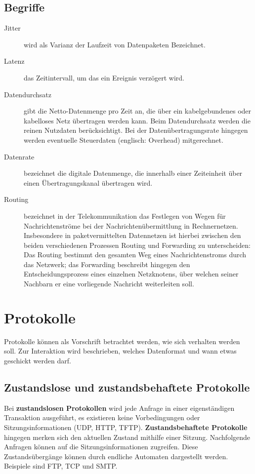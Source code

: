 \documentclass{article} %
\begin{document}
\subsection{Begriffe}
\begin{description}
	\item[Jitter] wird als Varianz der Laufzeit von Datenpaketen Bezeichnet.
	\item[Latenz] das Zeitintervall, um das ein Ereignis verzögert wird.
	\item[Datendurchsatz] gibt die Netto-Datenmenge pro Zeit an, die über ein kabelgebundenes oder kabelloses Netz übertragen werden kann. Beim Datendurchsatz werden die reinen Nutzdaten berücksichtigt. Bei der Datenübertragungsrate hingegen werden eventuelle Steuerdaten (englisch: Overhead) mitgerechnet.
	\item[Datenrate] bezeichnet die digitale Datenmenge, die innerhalb einer Zeiteinheit über einen Übertragungskanal übertragen wird.
	\item[Routing]  bezeichnet in der Telekommunikation das Festlegen von Wegen für Nachrichtenströme bei der Nachrichtenübermittlung in Rechnernetzen. Insbesondere in paketvermittelten Datennetzen ist hierbei zwischen den beiden verschiedenen Prozessen Routing und Forwarding zu unterscheiden: Das Routing bestimmt den gesamten Weg eines Nachrichtenstroms durch das Netzwerk; das Forwarding beschreibt hingegen den Entscheidungsprozess eines einzelnen Netzknotens, über welchen seiner Nachbarn er eine vorliegende Nachricht weiterleiten soll.
\end{description}

\section{Protokolle}
Protokolle können als Vorschrift betrachtet werden, wie sich verhalten werden soll. Zur Interaktion wird beschrieben, welches Datenformat und wann etwas geschickt werden darf.
\subsection{Zustandslose und zustandsbehaftete Protokolle}
Bei \textbf{zustandslosen Protokollen} wird jede Anfrage in einer eigenständigen Transaktion ausgeführt, es existieren keine Vorbedingungen oder Sitzungsinformationen (UDP, HTTP, TFTP).
\textbf{Zustandsbehaftete Protokolle} hingegen merken sich den aktuellen Zustand mithilfe einer Sitzung.
Nachfolgende Anfragen können auf die Sitzungsinformationen zugreifen.
Diese Zustandsübergänge können durch endliche Automaten dargestellt werden.
Beispiele sind FTP, TCP und SMTP.
\end{document}
